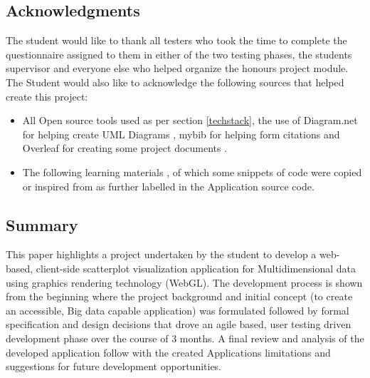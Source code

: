 \subsection{Acknowledgments}
The student would like to thank all testers who took the time to complete the questionnaire assigned to them in either of the two testing phases, the students supervisor and everyone else who helped organize the honours project module. The Student would also like to acknowledge the following sources that helped create this project:
\begin{itemize}
    \item All Open source tools used as per section \ref{techstack}, the use of Diagram.net for helping create UML Diagrams \cite{jgraphltd_diagram}, mybib for helping form citations \cite{mybib_2018_mybib} and Overleaf for creating some project documents \cite{overleaftheonlinelatexeditor_2019_overleaf}.
    \item The following learning materials \cite{devries_2019_learn} \cite{webgl} \cite{openglhome} \cite{mozilla_2019_mdn}, of which some snippets of code were copied or inspired from as further labelled in the Application source code.
\end{itemize}

\subsection{Summary}
This paper highlights a project undertaken by the student to develop a web-based, client-side scatterplot visualization application for Multidimensional data using graphics rendering technology (WebGL). The development process is shown from the beginning where the project background and initial concept (to create an accessible, Big data capable application) was formulated followed by formal specification and design decisions that drove an agile based, user testing driven development phase over the course of 3 months. A final review and analysis of the developed application follow with the created Applications limitations and suggestions for future development opportunities.
